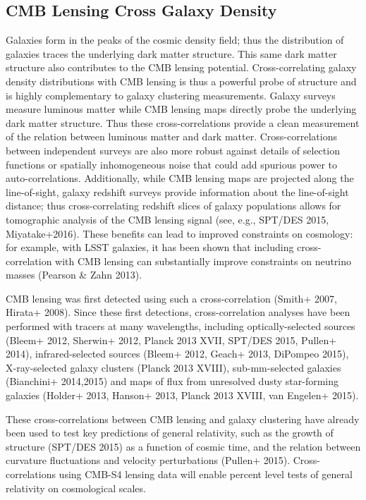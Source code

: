 \documentclass{tcibook}
\begin{document}
\subsection{CMB Lensing Cross Galaxy Density}
Galaxies form in the peaks of the cosmic density field; thus the distribution of galaxies traces the underlying dark matter structure.  This same dark matter structure also contributes to the CMB lensing potential.
Cross-correlating galaxy density distributions with CMB lensing is thus a powerful probe of structure and is highly complementary to galaxy clustering measurements.
Galaxy surveys measure luminous matter while CMB lensing maps directly probe the underlying dark matter structure. Thus these cross-correlations provide a clean measurement of the relation between luminous matter and dark matter.
Cross-correlations between independent surveys are also more robust against details of selection functions or spatially inhomogeneous noise that could add spurious power to auto-correlations.
Additionally, while CMB lensing maps are projected along the line-of-sight, galaxy redshift surveys provide information about the line-of-sight distance; thus cross-correlating redshift slices of galaxy populations allows for tomographic analysis of the CMB lensing signal (see, e.g., SPT/DES 2015, Miyatake+2016).
These benefits can lead to improved constraints on cosmology: for example, with LSST galaxies, it has been shown that including cross-correlation with CMB lensing can substantially improve constraints on neutrino masses (Pearson \& Zahn 2013).


CMB lensing was first detected using such a cross-correlation (Smith+ 2007, Hirata+ 2008).  Since these first detections, cross-correlation analyses have been performed with tracers at many wavelengths, including optically-selected sources (Bleem+ 2012, Sherwin+ 2012, Planck 2013 XVII, SPT/DES 2015, Pullen+ 2014), infrared-selected sources (Bleem+ 2012, Geach+ 2013, DiPompeo 2015), X-ray-selected galaxy clusters (Planck 2013 XVIII), sub-mm-selected galaxies (Bianchini+ 2014,2015) and maps of flux from unresolved dusty star-forming galaxies (Holder+ 2013, Hanson+ 2013, Planck 2013 XVIII, van Engelen+ 2015). 

These cross-correlations between CMB lensing and galaxy clustering have already been used to test key predictions of general relativity, such as the growth of structure (SPT/DES 2015) as a function of cosmic time, and the relation between curvature fluctuations and velocity perturbations (Pullen+ 2015). Cross-correlations using CMB-S4 lensing data will enable percent level tests of general relativity on cosmological scales.
\end{document}
